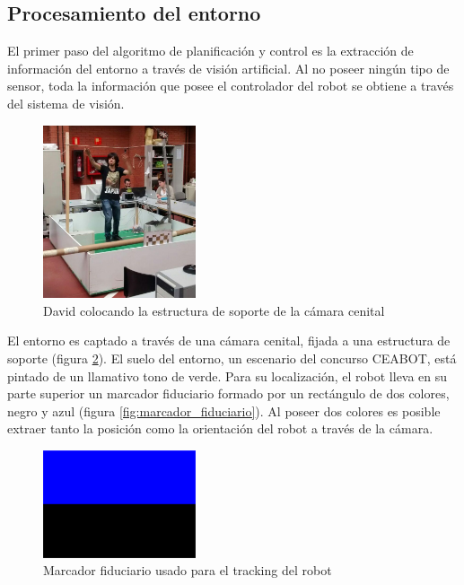\subsection{Procesamiento del entorno}
\label{procesamiento}

El primer paso del algoritmo de planificación y control es la extracción de información del entorno a través de visión artificial. Al no poseer ningún tipo de sensor, toda la información que posee el controlador del robot se obtiene a través del sistema de visión.\\

\begin{figure}[H]
        \centering
        \includegraphics[width=0.4\textwidth]{images/escenario.jpg}
        \caption{David colocando la estructura de soporte de la cámara cenital}
        \label{fig:foto_estructura_nave}
\end{figure} 

El entorno es captado a través de una cámara cenital, fijada a una estructura de soporte (figura \ref{fig:foto_estructura_nave}). El suelo del entorno, un escenario del concurso CEABOT, está pintado de un llamativo tono de verde. Para su localización, el robot lleva en su parte superior un marcador fiduciario formado por un rectángulo de dos colores, negro y azul (figura \ref{fig:marcador_fiduciario}). Al poseer dos colores es posible extraer tanto la posición como la orientación del robot a través de la cámara.\\

\begin{figure}[H]
        \centering
        \includegraphics[width=0.4\textwidth]{images/marcador.png}
        \caption{Marcador fiduciario usado para el tracking del robot}
        \label{fig:foto_estructura_nave}
\end{figure} 

